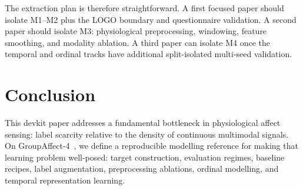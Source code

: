 \documentclass[sigconf,nonacm]{acmart}
\begin{document}
The extraction plan is therefore straightforward.
A first focused paper should isolate M1--M2 plus the LOGO boundary and
questionnaire validation.
A second paper should isolate M3: physiological preprocessing, windowing,
feature smoothing, and modality ablation.
A third paper can isolate M4 once the temporal and ordinal tracks have
additional split-isolated multi-seed validation.

\section{Conclusion}
\label{sec:conclusion}

This devkit paper addresses a fundamental bottleneck in physiological affect
sensing: label scarcity relative to the density of continuous multimodal
signals.
On GroupAffect-4~\cite{groupaffect4}, we define a reproducible modelling
reference for making that learning problem well-posed: target construction,
evaluation regimes, baseline recipes, label augmentation, preprocessing
ablations, ordinal modelling, and temporal representation learning.
\end{document}
